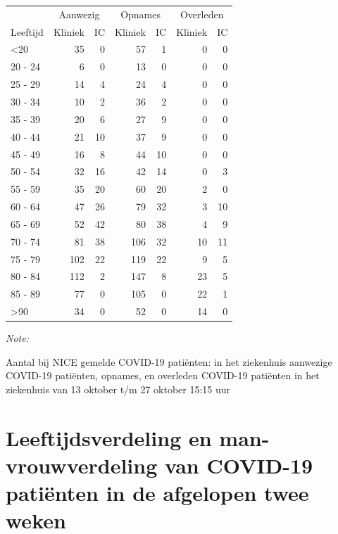 \documentclass[
  english,
  man,floatsintext]{apa6}
\begin{document}
\begin{table}
\centering\begingroup\fontsize{10}{12}\selectfont

\begin{threeparttable}
\begin{tabular}{lrrrrrr}
\toprule
\multicolumn{1}{c}{ } & \multicolumn{2}{c}{Aanwezig} & \multicolumn{2}{c}{Opnames} & \multicolumn{2}{c}{Overleden} \\
\cmidrule(l{3pt}r{3pt}){2-3} \cmidrule(l{3pt}r{3pt}){4-5} \cmidrule(l{3pt}r{3pt}){6-7}
Leeftijd & Kliniek & IC & Kliniek & IC & Kliniek & IC\\
\midrule
<20 & 35 & 0 & 57 & 1 & 0 & 0\\
20 - 24 & 6 & 0 & 13 & 0 & 0 & 0\\
25 - 29 & 14 & 4 & 24 & 4 & 0 & 0\\
30 - 34 & 10 & 2 & 36 & 2 & 0 & 0\\
35 - 39 & 20 & 6 & 27 & 9 & 0 & 0\\
40 - 44 & 21 & 10 & 37 & 9 & 0 & 0\\
45 - 49 & 16 & 8 & 44 & 10 & 0 & 0\\
50 - 54 & 32 & 16 & 42 & 14 & 0 & 3\\
55 - 59 & 35 & 20 & 60 & 20 & 2 & 0\\
60 - 64 & 47 & 26 & 79 & 32 & 3 & 10\\
65 - 69 & 52 & 42 & 80 & 38 & 4 & 9\\
70 - 74 & 81 & 38 & 106 & 32 & 10 & 11\\
75 - 79 & 102 & 22 & 119 & 22 & 9 & 5\\
80 - 84 & 112 & 2 & 147 & 8 & 23 & 5\\
85 - 89 & 77 & 0 & 105 & 0 & 22 & 1\\
>90 & 34 & 0 & 52 & 0 & 14 & 0\\
\bottomrule
\end{tabular}
\begin{tablenotes}
\item \textit{Note: } 
\item Aantal bij NICE gemelde COVID-19 patiënten: in het ziekenhuis aanwezige COVID-19 patiënten, opnames, en overleden COVID-19 patiënten in het ziekenhuis van 13 oktober t/m 27 oktober 15:15 uur
\end{tablenotes}
\end{threeparttable}
\endgroup{}
\end{table}

\newpage

\hypertarget{leeftijdsverdeling-en-man-vrouwverdeling-van-covid-19-patiuxebnten-in-de-afgelopen-twee-weken}{%
\section{Leeftijdsverdeling en man-vrouwverdeling van COVID-19 patiënten in de afgelopen twee weken}\label{leeftijdsverdeling-en-man-vrouwverdeling-van-covid-19-patiuxebnten-in-de-afgelopen-twee-weken}}
\end{document}
